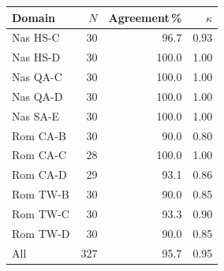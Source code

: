 \begin{tabular}{lrrr}
\toprule
Domain & $N$ & Agreement\,\% & $\kappa$ \\
\midrule
Nas HS-C & 30 & 96.7 & 0.93 \\
Nas HS-D & 30 & 100.0 & 1.00 \\
Nas QA-C & 30 & 100.0 & 1.00 \\
Nas QA-D & 30 & 100.0 & 1.00 \\
Nas SA-E & 30 & 100.0 & 1.00 \\
Rom CA-B & 30 & 90.0 & 0.80 \\
Rom CA-C & 28 & 100.0 & 1.00 \\
Rom CA-D & 29 & 93.1 & 0.86 \\
Rom TW-B & 30 & 90.0 & 0.85 \\
Rom TW-C & 30 & 93.3 & 0.90 \\
Rom TW-D & 30 & 90.0 & 0.85 \\
\midrule
All & 327 & 95.7 & 0.95 \\
\bottomrule
\end{tabular}
